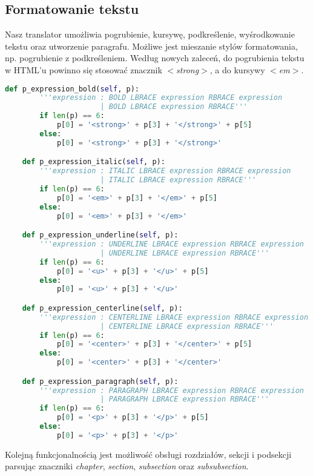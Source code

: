 \subsection{Formatowanie tekstu}

Nasz translator umożliwia pogrubienie, kursywę, podkreślenie, wyśrodkowanie tekstu oraz utworzenie paragrafu. 
Możliwe jest mieszanie stylów formatowania, np. pogrubienie z podkreśleniem. 
Według nowych zaleceń, do pogrubienia tekstu w HTML'u powinno się stosować znacznik
\textit{$<$strong$>$}, a do kursywy \textit{$<$em$>$}.

\begin{lstlisting}[language={Python}, caption={Gramatyka - pogrubienie, kursywa, podkreślenie, wyśrodkowanie tekstu}, label={gramatyka-pogrubienie-kursywa}]
    def p_expression_bold(self, p):
        '''expression : BOLD LBRACE expression RBRACE expression
                      | BOLD LBRACE expression RBRACE'''
        if len(p) == 6:
            p[0] = '<strong>' + p[3] + '</strong>' + p[5]
        else:
            p[0] = '<strong>' + p[3] + '</strong>'

    def p_expression_italic(self, p):
        '''expression : ITALIC LBRACE expression RBRACE expression
                      | ITALIC LBRACE expression RBRACE'''
        if len(p) == 6:
            p[0] = '<em>' + p[3] + '</em>' + p[5]
        else:
            p[0] = '<em>' + p[3] + '</em>'

    def p_expression_underline(self, p):
        '''expression : UNDERLINE LBRACE expression RBRACE expression
                      | UNDERLINE LBRACE expression RBRACE'''
        if len(p) == 6:
            p[0] = '<u>' + p[3] + '</u>' + p[5]
        else:
            p[0] = '<u>' + p[3] + '</u>'

    def p_expression_centerline(self, p):
        '''expression : CENTERLINE LBRACE expression RBRACE expression
                      | CENTERLINE LBRACE expression RBRACE'''
        if len(p) == 6:
            p[0] = '<center>' + p[3] + '</center>' + p[5]
        else:
            p[0] = '<center>' + p[3] + '</center>'

    def p_expression_paragraph(self, p):
        '''expression : PARAGRAPH LBRACE expression RBRACE expression
                      | PARAGRAPH LBRACE expression RBRACE'''
        if len(p) == 6:
            p[0] = '<p>' + p[3] + '</p>' + p[5]
        else:
            p[0] = '<p>' + p[3] + '</p>'
\end{lstlisting}

Kolejną funkcjonalnością jest możliwość obsługi rozdziałów, sekcji i podsekcji parsując 
znaczniki \textit{chapter}, \textit{section}, \textit{subsection} oraz \textit{subsubsection}.

